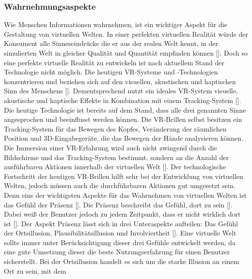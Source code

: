 \documentclass[a4paper,12pt,oneside]{article}
\begin{document}
      \subsubsection{Wahrnehmungsaspekte} \label{Wahrnehmungsaspekte}
        Wie Menschen Informationen wahrnehmen, ist ein wichtiger Aspekt für die Gestaltung
        von virtuellen Welten. In einer perfekten virtuellen Realität würde der Konsument
        alle Sinneseindrücke die er aus der realen Welt kennt, in der simulierten Welt
        in gleicher Qualität und Quantität empfinden können [\cite[17]{Dorner2013}].
        Doch so eine perfekte virtuelle Realität zu entwickeln ist nach aktuellem Stand
        der Technologie nicht möglich. Die heutigen VR-Systeme und -Technologien
        konzentrieren und beziehen sich auf den visuellen, akustischen und haptischen Sinn
        des Menschens [\cite[34]{Dorner2013}]. Dementsprechend nutzt ein ideales
        VR-System visuelle, akustische und haptische Effekte in Kombination mit einem
        Tracking-System [\cite{Slater2009}]. Die heutige Technologie ist bereits auf
        dem Stand, dass alle drei genannten Sinne angesprochen und beeinflusst
        werden können. Die VR-Brillen selbst besitzen ein Tracking-System für das
        Bewegen des Kopfes, Veränderung der räumlichen Position und 3D-Eingabegeräte,
        die das Bewegen der Hände analysieren können. Die Immersion einer VR-Erfahrung
        wird auch nicht zwingend durch die Bildschirme und das Tracking-System bestimmt,
        sondern an die Anzahl der ausführbaren Aktionen innerhalb der virtuellen 
        Welt [\cite{Slater2009}]. Der technologische Fortschritt der heutigen VR-Brillen
        hilft sehr bei der Entwicklung von virtuellen Welten, jedoch müssen auch die
        durchführbaren Aktionen gut umgesetzt sein. Denn eins der wichtigsten Aspekte
        für das Wahrnehmen von virtuellen Welten ist das Gefühl der 
        Präsenz [\cite{Slater2009}]. Die Präsenz beschreibt das Gefühl, dort zu sein
        [\cite{Slater2009}]. Dabei weiß der Benutzer jedoch zu jedem Zeitpunkt, dass er
        nicht wirklich dort ist [\cite{Slater2009}]. Der Aspekt Präsenz lässt sich in
        drei Unteraspekte aufteilen: Das Gefühl der Ortsillusion, Plausibilitätsillusion
        und Involviertheit [\cite[18-19]{Dorner2013}]. Eine virtuelle Welt sollte immer unter
        Berücksichtigung dieser drei Gefühle entwickelt werden, da eine gute Umsetzung
        dieser die beste Nutzungserfahrung für einen Benutzer sicherstellt. Bei der 
        Ortsillusion handelt es sich um die starke Illusion an einem Ort zu sein, mit dem
\end{document}
